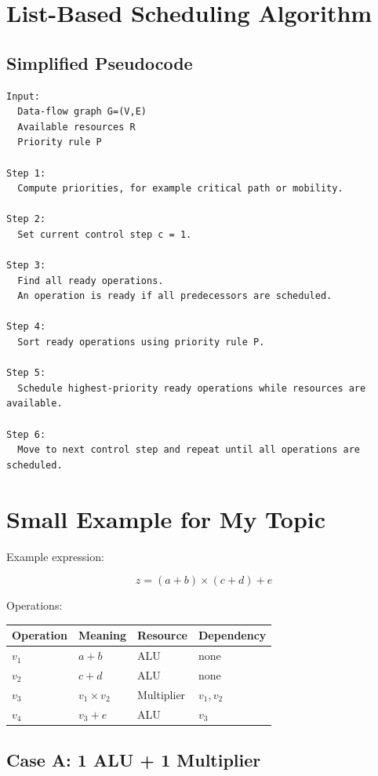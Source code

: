 \documentclass[11pt,a4paper]{article}
\begin{document}
\section{List-Based Scheduling Algorithm}

\subsection*{Simplified Pseudocode}

\begin{verbatim}
Input:
  Data-flow graph G=(V,E)
  Available resources R
  Priority rule P

Step 1:
  Compute priorities, for example critical path or mobility.

Step 2:
  Set current control step c = 1.

Step 3:
  Find all ready operations.
  An operation is ready if all predecessors are scheduled.

Step 4:
  Sort ready operations using priority rule P.

Step 5:
  Schedule highest-priority ready operations while resources are available.

Step 6:
  Move to next control step and repeat until all operations are scheduled.
\end{verbatim}

\section{Small Example for My Topic}

Example expression:

\[
z = (a+b)\times(c+d)+e
\]

Operations:

\begin{table}[h]
\centering
\begin{tabular}{llll}
\toprule
Operation & Meaning & Resource & Dependency \\
\midrule
$v_1$ & $a+b$ & ALU & none \\
$v_2$ & $c+d$ & ALU & none \\
$v_3$ & $v_1 \times v_2$ & Multiplier & $v_1,v_2$ \\
$v_4$ & $v_3+e$ & ALU & $v_3$ \\
\bottomrule
\end{tabular}
\end{table}

\subsection*{Case A: 1 ALU + 1 Multiplier}
\end{document}
